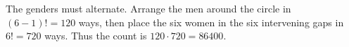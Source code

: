 The genders must alternate. Arrange the men around the circle in $(6-1)!=120$ ways, then place the six women in the six intervening gaps in $6!=720$ ways. Thus the count is $120\cdot720=\boxed{86400}$.

